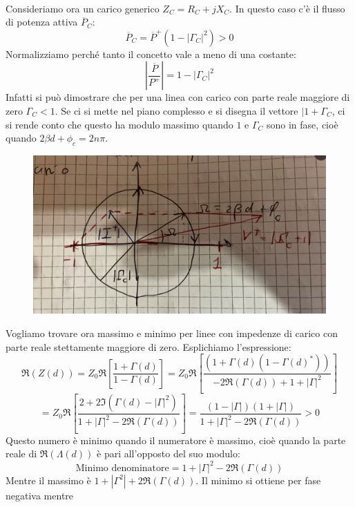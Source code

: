 \documentclass{book}
\begin{document}
    \\ Consideriamo ora un carico generico $Z_{C}=R_{C}+jX_{C}$. In questo caso c'è il flusso di potenza 
    attiva $\overline{P}_{C}$:
    \begin{equation}
        \overline{P}_{C}=\overline{P}^{+}(1-|\Gamma_{C}|^{2}) > 0
    \end{equation}    
    Normalizziamo perché tanto il concetto vale a meno di una costante:
    \begin{equation}
        |\frac{\overline{P}}{P^{+}}| = 1-|\Gamma_{C}|^{2}
    \end{equation}
    Infatti si può dimostrare che per una linea con carico con parte reale maggiore di zero $\Gamma_{C}<1$.
    Se ci si mette nel piano complesso e si disegna il vettore $|1+\Gamma_{C}$, ci si rende conto che questo ha modulo 
    massimo quando $1$ e $\Gamma_{C}$ sono in fase, cioè quando $2\beta d + \phi_{c} = 2 n \pi$.
    \newpage
    \begin{figure}[h!]
        \center  
        \includegraphics[width=0.5\linewidth]{Chapter_two/Chapt2img12.png}
    \end{figure} 
    Vogliamo trovare ora massimo e minimo per linee con impedenze di carico con parte reale stettamente maggiore di zero.
    Esplichiamo l'espressione:
    \begin{equation} 
        \Re(Z(d)) = Z_{0}\Re[\frac{1+\Gamma(d)}{1-\Gamma(d)}] = Z_{0}\Re[\frac{(1+\Gamma(d)(1-\Gamma(d)^{*}))}{-2\Re(\Gamma(d))+1+|\Gamma|^{2}}]
    \end{equation}
    \begin{equation}
        = Z_{0}\Re[\frac{2+2\Im(\Gamma(d)-|\Gamma|^{2})}{1+|\Gamma|^{2}-2\Re(\Gamma(d))}] = \frac{(1-|\Gamma|)(1+|\Gamma|)}{1+|\Gamma|^{2}-2\Re(\Gamma(d))} > 0
    \end{equation}
    Questo numero è minimo quando il numeratore è massimo, cioè quando la parte reale di $\Re(\Lambda(d))$ è pari all'opposto del suo modulo:
    \begin{equation}
        \textrm{Minimo denominatore} = 1+|\Gamma|^{2}-2\Re(\Gamma (d))
    \end{equation}
    Mentre il massimo è $1+|\Gamma ^{2}|+2\Re(\Gamma (d))$. Il minimo si ottiene per fase negativa mentre 
\end{document}
